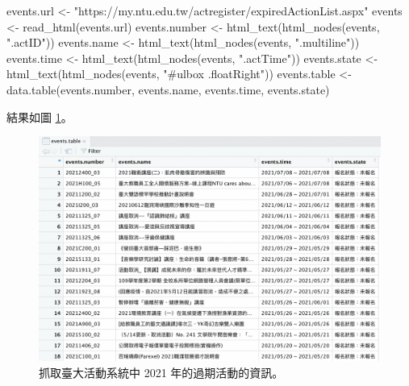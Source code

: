 \documentclass[
]{book}
\newenvironment{Shaded}{\begin{snugshade}}{\end{snugshade}}
\newcommand{\FunctionTok}[1]{\textcolor[rgb]{0.00,0.00,0.00}{#1}}
\newcommand{\NormalTok}[1]{#1}
\newcommand{\OtherTok}[1]{\textcolor[rgb]{0.56,0.35,0.01}{#1}}
\newcommand{\StringTok}[1]{\textcolor[rgb]{0.31,0.60,0.02}{#1}}
\theoremstyle{definition}
\theoremstyle{remark}
\begin{document}
\begin{Shaded}
\begin{Highlighting}[]
\NormalTok{events.url }\OtherTok{\textless{}{-}} \StringTok{"https://my.ntu.edu.tw/actregister/expiredActionList.aspx"}
\NormalTok{events }\OtherTok{\textless{}{-}} \FunctionTok{read\_html}\NormalTok{(events.url)}
\NormalTok{events.number }\OtherTok{\textless{}{-}} \FunctionTok{html\_text}\NormalTok{(}\FunctionTok{html\_nodes}\NormalTok{(events, }\StringTok{".actID"}\NormalTok{))}
\NormalTok{events.name }\OtherTok{\textless{}{-}} \FunctionTok{html\_text}\NormalTok{(}\FunctionTok{html\_nodes}\NormalTok{(events, }\StringTok{".multiline"}\NormalTok{))}
\NormalTok{events.time }\OtherTok{\textless{}{-}} \FunctionTok{html\_text}\NormalTok{(}\FunctionTok{html\_nodes}\NormalTok{(events, }\StringTok{".actTime"}\NormalTok{))}
\NormalTok{events.state }\OtherTok{\textless{}{-}} \FunctionTok{html\_text}\NormalTok{(}\FunctionTok{html\_nodes}\NormalTok{(events, }\StringTok{"\#ulbox .floatRight"}\NormalTok{))}
\NormalTok{events.table }\OtherTok{\textless{}{-}} \FunctionTok{data.table}\NormalTok{(events.number, events.name, events.time, events.state)}
\end{Highlighting}
\end{Shaded}

結果如圖 \ref{fig:ntueventstable}。

\begin{figure}

{\centering \includegraphics[width=650pt]{images/截圖 2021-07-21 下午6.07.38} 

}

\caption{抓取臺大活動系統中 2021 年的過期活動的資訊。}\label{fig:ntueventstable}
\end{figure}
\end{document}

